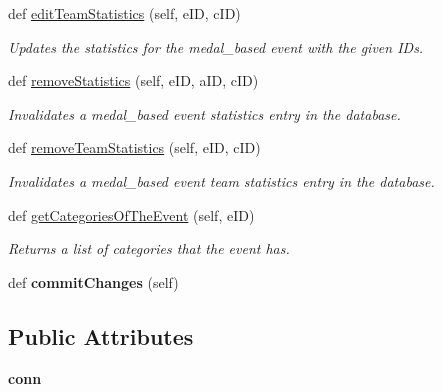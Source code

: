 \begin{DoxyCompactItemize}
def \hyperlink{classhandler_1_1dao_1_1medal__based__event__dao_1_1_medal_based_event_d_a_o_a73113e3f9d7068be4bf7b1ddaf0371f0}{edit\+Team\+Statistics} (self, e\+ID, c\+ID)
\begin{DoxyCompactList}\small\item\em Updates the statistics for the medal\+\_\+based event with the given I\+Ds. \end{DoxyCompactList}\item 
def \hyperlink{classhandler_1_1dao_1_1medal__based__event__dao_1_1_medal_based_event_d_a_o_a9497c2bcc968769afdfad9e36a4a6186}{remove\+Statistics} (self, e\+ID, a\+ID, c\+ID)
\begin{DoxyCompactList}\small\item\em Invalidates a medal\+\_\+based event statistics entry in the database. \end{DoxyCompactList}\item 
def \hyperlink{classhandler_1_1dao_1_1medal__based__event__dao_1_1_medal_based_event_d_a_o_a4b9d007df7bae642221ffb3a3655206a}{remove\+Team\+Statistics} (self, e\+ID, c\+ID)
\begin{DoxyCompactList}\small\item\em Invalidates a medal\+\_\+based event team statistics entry in the database. \end{DoxyCompactList}\item 
def \hyperlink{classhandler_1_1dao_1_1medal__based__event__dao_1_1_medal_based_event_d_a_o_aad2f421de678c6695d64b623761e4890}{get\+Categories\+Of\+The\+Event} (self, e\+ID)
\begin{DoxyCompactList}\small\item\em Returns a list of categories that the event has. \end{DoxyCompactList}\item 
\mbox{\label{classhandler_1_1dao_1_1medal__based__event__dao_1_1_medal_based_event_d_a_o_aa80a5c2a860d04d69832b3f0109dd3dd}} 
def {\bfseries commit\+Changes} (self)
\end{DoxyCompactItemize}
\subsection*{Public Attributes}
\begin{DoxyCompactItemize}
\item 
\mbox{\label{classhandler_1_1dao_1_1medal__based__event__dao_1_1_medal_based_event_d_a_o_a74778e4ccc31dbd9f06441a42f93ca8c}} 
{\bfseries conn}
\end{DoxyCompactItemize}


